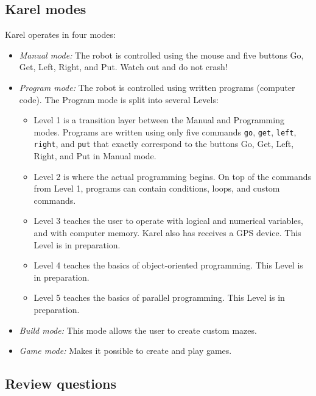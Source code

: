 \documentclass[article,A4,12pt]{llncs}
\begin{document}
\subsection{Karel modes} \label{levels}

Karel operates in four modes:
\begin{itemize}
\item {\em Manual mode:} The robot is controlled using the mouse and five buttons Go, Get, Left, Right, and Put. 
      Watch out and do not crash!
\item {\em Program mode:} The robot is controlled using written programs (computer code). The Program mode is 
      split into several Levels:
\begin{itemize}
\item Level 1 is a transition layer between the Manual and Programming modes. Programs are written using only 
      five commands {\tt go}, {\tt get}, {\tt left}, {\tt right}, and {\tt put} that exactly correspond to 
      the buttons Go, Get, Left, Right, and Put in Manual mode.
\item Level 2 is where the actual programming begins. On top of the commands from Level 1, programs can contain 
      conditions, loops, and custom commands.
\item Level 3 teaches the user to operate with logical and numerical variables, and with computer memory. Karel  
      also has receives a GPS device. This Level is in preparation.
\item Level 4 teaches the basics of object-oriented programming. This Level is in preparation.
\item Level 5 teaches the basics of parallel programming. This Level is in preparation.
\end{itemize}
\item {\em Build mode:} This mode allows the user to create custom mazes.
\item {\em Game mode:} Makes it possible to create and play games. 
\end{itemize}

\subsection{Review questions}
\end{document}

